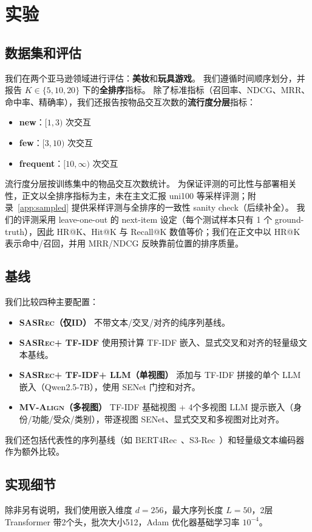 \documentclass[sigconf,natbib=true]{acmart}
\newcommand{\model}{\textsc{MV-Align}\xspace}
\newcommand{\base}{\textsc{SASRec}\xspace}
\newcommand{\tfidf}{\textsc{TF-IDF}\xspace}
\newcommand{\llm}{\textsc{LLM}\xspace}
\begin{document}
\section{实验}
\subsection{数据集和评估}
我们在两个亚马逊领域进行评估：\textbf{美妆}和\textbf{玩具游戏}。
我们遵循时间顺序划分，并报告 $K\in\{5,10,20\}$ 下的\textbf{全排序}指标。
除了标准指标（召回率、NDCG、MRR、命中率、精确率），我们还报告按物品交互次数的\textbf{流行度分层}指标：
\begin{itemize}[leftmargin=*,itemsep=1pt]
  \item \textbf{new}：$[1,3)$ 次交互
  \item \textbf{few}：$[3,10)$ 次交互
  \item \textbf{frequent}：$[10,\infty)$ 次交互
\end{itemize}
流行度分层按训练集中的物品交互次数统计。
为保证评测的可比性与部署相关性，正文以全排序指标为主，未在主文汇报 uni100 等采样评测；附录~\ref{app:sampled} 提供采样评测与全排序的一致性 sanity check（后续补全）。
我们的评测采用 leave-one-out 的 next-item 设定（每个测试样本只有 1 个 ground-truth），因此 HR@K、Hit@K 与 Recall@K 数值等价；我们在正文中以 HR@K 表示命中/召回，并用 MRR/NDCG 反映靠前位置的排序质量。

\subsection{基线}
我们比较四种主要配置：
\begin{itemize}[leftmargin=*,itemsep=2pt]
  \item \textbf{\base（仅ID）} 不带文本/交叉/对齐的纯序列基线。
  \item \textbf{\base + \tfidf} 使用预计算 \tfidf 嵌入、显式交叉和对齐的轻量级文本基线。
  \item \textbf{\base + \tfidf + \llm（单视图）} 添加与 \tfidf 拼接的单个 \llm 嵌入（Qwen2.5-7B），使用 SENet 门控和对齐。
  \item \textbf{\model（多视图）} \tfidf 基础视图 + 4个多视图 \llm 提示嵌入（身份/功能/受众/类别），带逐视图 SENet、显式交叉和多视图对比对齐。
\end{itemize}
我们还包括代表性的序列基线（如 BERT4Rec~\cite{sun2019bert4rec}、S3-Rec~\cite{zhou2020s3rec}）和轻量级文本编码器作为额外比较。

\subsection{实现细节}
除非另有说明，我们使用嵌入维度 $d=256$，最大序列长度 $L=50$，2层 Transformer 带2个头，批次大小512，Adam 优化器基础学习率 $10^{-4}$。
\end{document}
